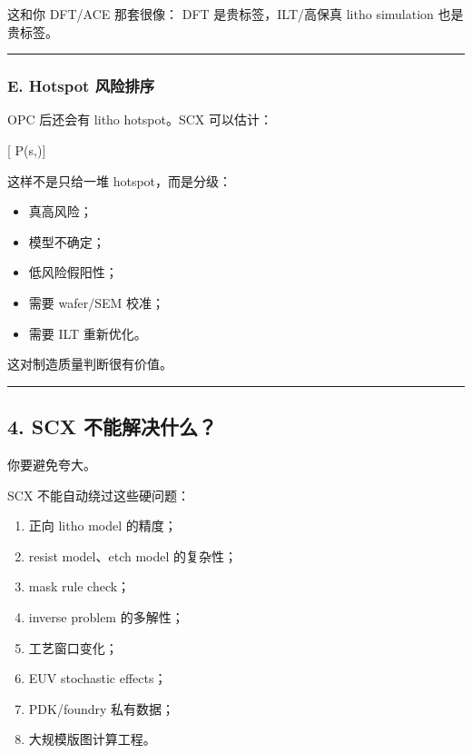 \documentclass[
  12pt,
]{ctexart}
\providecommand{\tightlist}{%
  \setlength{\itemsep}{0pt}\setlength{\parskip}{0pt}}
\begin{document}
这和你 DFT/ACE 那套很像： DFT 是贵标签，ILT/高保真 litho simulation
也是贵标签。

\begin{center}\rule{0.5\linewidth}{0.5pt}\end{center}

\subsubsection{E. Hotspot
风险排序}\label{e.-hotspot-ux98ceux9669ux6392ux5e8f}

OPC 后还会有 litho hotspot。SCX 可以估计：

{[} P(\mid s,){]}

这样不是只给一堆 hotspot，而是分级：

\begin{itemize}
\tightlist
\item
  真高风险；
\item
  模型不确定；
\item
  低风险假阳性；
\item
  需要 wafer/SEM 校准；
\item
  需要 ILT 重新优化。
\end{itemize}

这对制造质量判断很有价值。

\begin{center}\rule{0.5\linewidth}{0.5pt}\end{center}

\subsection{4. SCX
不能解决什么？}\label{scx-ux4e0dux80fdux89e3ux51b3ux4ec0ux4e48}

你要避免夸大。

SCX 不能自动绕过这些硬问题：

\begin{enumerate}
\def\labelenumi{\arabic{enumi}.}
\tightlist
\item
  正向 litho model 的精度；
\item
  resist model、etch model 的复杂性；
\item
  mask rule check；
\item
  inverse problem 的多解性；
\item
  工艺窗口变化；
\item
  EUV stochastic effects；
\item
  PDK/foundry 私有数据；
\item
  大规模版图计算工程。
\end{enumerate}
\end{document}
